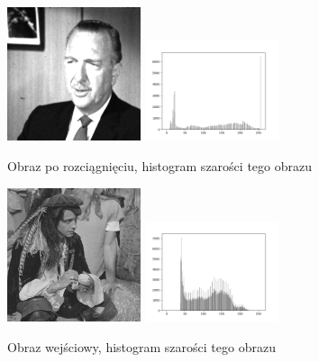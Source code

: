 \documentclass[final,a4paper,openany,12pt]{mwbk}
\begin{document}
\begin{figure}[H]
	\begin{center}
		\includegraphics[width=0.35\textwidth]{gentelman_gray_stretchHist_result}
		\includegraphics[width=0.35\textwidth]{gentelman_gray_stretchHist_histogram}
	\end{center}
	\caption{Obraz po rozciągnięciu, histogram szarości tego obrazu}
\end{figure}

\begin{figure}[H]
	\begin{center}
		\includegraphics[width=0.35\textwidth]{pirate_gray}
		\includegraphics[width=0.35\textwidth]{pirate_gray_histogram}
	\end{center}
	\caption{Obraz wejściowy, histogram szarości tego obrazu}
\end{figure}
\end{document}
